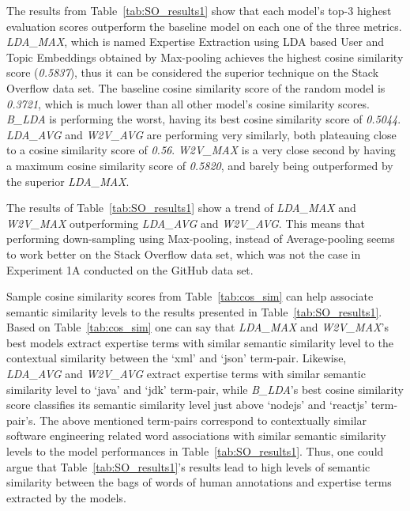             The results from Table~\ref{tab:SO_results1} show that each model's top-$3$ highest evaluation scores outperform the baseline model on each one of the three metrics. \emph{LDA\_MAX}, which is named Expertise Extraction using LDA based User and Topic Embeddings obtained by Max-pooling achieves the highest cosine similarity score (\emph{0.5837}), thus it can be considered the superior technique on the Stack Overflow data set. The baseline cosine similarity score of the random model is \emph{0.3721}, which is much lower than all other model's cosine similarity scores. \emph{B\_LDA} is performing the worst, having its best cosine similarity score of \emph{0.5044}. \emph{LDA\_AVG} and \emph{W2V\_AVG} are performing very similarly, both plateauing close to a cosine similarity score of \emph{0.56}. \emph{W2V\_MAX} is a very close second by having a maximum cosine similarity score of \emph{0.5820}, and barely being outperformed by the superior \emph{LDA\_MAX}.
            
            The results of Table~\ref{tab:SO_results1} show a trend of \emph{LDA\_MAX} and \emph{W2V\_MAX} outperforming \emph{LDA\_AVG} and \emph{W2V\_AVG}. This means that performing down-sampling using Max-pooling, instead of Average-pooling seems to work better on the Stack Overflow data set, which was not the case in Experiment 1A conducted on the GitHub data set.
            
            Sample cosine similarity scores from Table~\ref{tab:cos_sim} can help associate semantic similarity levels to the results presented in Table~\ref{tab:SO_results1}. Based on Table~\ref{tab:cos_sim} one can say that  \emph{LDA\_MAX} and \emph{W2V\_MAX}'s best models extract expertise terms with similar semantic similarity level to the contextual similarity between the `xml' and `json' term-pair. Likewise, \emph{LDA\_AVG} and \emph{W2V\_AVG} extract expertise terms with similar semantic similarity level to `java' and `jdk' term-pair, while \emph{B\_LDA}'s best cosine similarity score classifies its semantic similarity level just above `nodejs' and `reactjs' term-pair's. The above mentioned term-pairs correspond to contextually similar software engineering related word associations with similar semantic similarity levels to the model performances in Table~\ref{tab:SO_results1}. Thus, one could argue that Table~\ref{tab:SO_results1}'s results lead to high levels of semantic similarity between the bags of words of human annotations and expertise terms extracted by the models.
            
